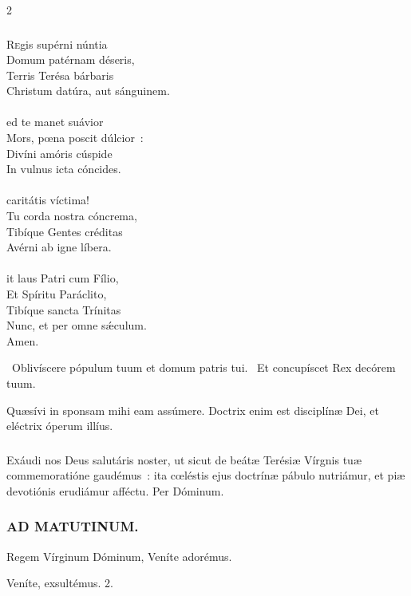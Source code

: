 \documentclass[9pt,twoside]{extarticle}
\begin{document}
\begin{multicols}{2}
{{{\subsubsection*{\center {}}
\begin{center}\end{center}
\lettrine{R}egis supérni núntia\\
Domum patérnam déseris,\\
Terris Terésa bárbaris\\
Christum datúra, aut sánguinem.\\
\\
ed te manet suávior\\
Mors, pœna poscit dúlcior~:\\
Divíni amóris cúspide\\
In vulnus icta cóncides.\\
\\
 caritátis víctima!\\
Tu corda nostra cóncrema,\\
Tibíque Gentes créditas\\
Avérni ab igne líbera.\\
\\
it laus Patri cum Fílio,\\
Et Spíritu Paráclito,\\
Tibíque sancta Trínitas\\
Nunc, et per omne sǽculum.\\
Amen.

\begin{tightlist}{}
\item {}~Oblivíscere pópulum tuum et domum patris tui. ~Et concupíscet Rex decórem tuum.
\item {} Quæsívi in sponsam mihi eam assúmere. Doctrix enim est disciplínæ Dei, et eléctrix óperum illíus.
\end{tightlist}

\subsubsection*{\center {}}
\lettrine{E}xáudi nos Deus salutáris noster, ut sicut de beátæ Terésiæ Vírgnis tuæ commemoratióne gaudémus~: ita cœléstis ejus doctrínæ pábulo nutriámur, et piæ devotiónis erudiámur afféctu. Per Dóminum.

\subsubsection*{\center \textsc{AD MATUTINUM.}}
\begin{tightlist}{}
\item {} Regem Vírginum Dóminum, \textred{*} Veníte adorémus.
\item {} Veníte, exsultémus. 2.
\item {}
\end{tightlist}

}}}
\end{multicols}
\end{document}
